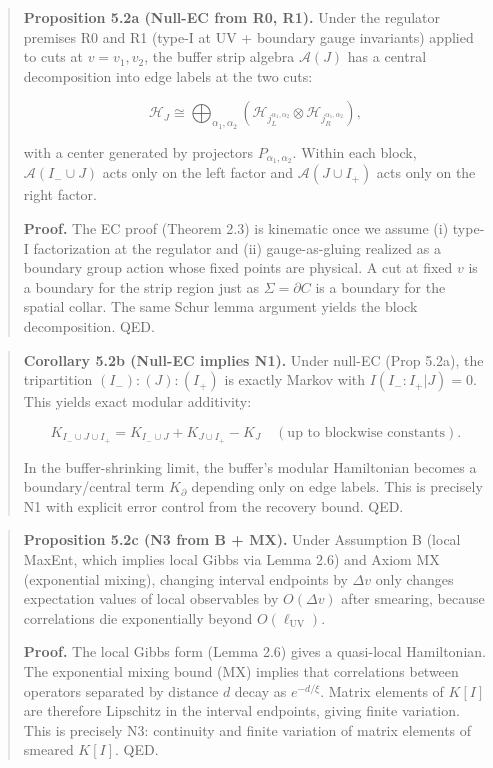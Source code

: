 \documentclass[11pt,a4paper]{article}
\theoremstyle{remark}
\begin{document}
\begin{quote}
\textbf{Proposition 5.2a (Null-EC from R0, R1).} Under the regulator premises R0
and R1 (type-I at UV + boundary gauge invariants) applied to cuts at
\(v = v_1, v_2\), the buffer strip algebra \(\mathcal{A}(J)\) has a central
decomposition into edge labels at the two cuts:

\[
\mathcal{H}_J \cong \bigoplus_{\alpha_1, \alpha_2}
\left(\mathcal{H}_{j_L^{\alpha_1, \alpha_2}} \otimes
\mathcal{H}_{j_R^{\alpha_1, \alpha_2}}\right),
\]

with a center generated by projectors \(P_{\alpha_1, \alpha_2}\). Within each
block, \(\mathcal{A}(I_- \cup J)\) acts only on the left factor and
\(\mathcal{A}(J \cup I_+)\) acts only on the right factor.

\textbf{Proof.} The EC proof (Theorem 2.3) is kinematic once we assume
(i) type-I factorization at the regulator and (ii) gauge-as-gluing realized
as a boundary group action whose fixed points are physical. A cut at fixed
\(v\) is a boundary for the strip region just as \(\Sigma = \partial C\) is a
boundary for the spatial collar. The same Schur lemma argument yields the
block decomposition. QED.
\end{quote}

\begin{quote}
\textbf{Corollary 5.2b (Null-EC implies N1).} Under null-EC (Prop 5.2a), the
tripartition \((I_-):(J):(I_+)\) is exactly Markov with \(I(I_-:I_+ | J) = 0\).
This yields exact modular additivity:

\[
K_{I_- \cup J \cup I_+} = K_{I_- \cup J} + K_{J \cup I_+} - K_J
\quad (\text{up to blockwise constants}).
\]

In the buffer-shrinking limit, the buffer's modular Hamiltonian becomes a
boundary/central term \(K_\partial\) depending only on edge labels. This is
precisely N1 with explicit error control from the recovery bound. QED.
\end{quote}

\begin{quote}
\textbf{Proposition 5.2c (N3 from B + MX).} Under Assumption B (local MaxEnt,
which implies local Gibbs via Lemma 2.6) and Axiom MX (exponential mixing),
changing interval endpoints by \(\Delta v\) only changes expectation values of
local observables by \(O(\Delta v)\) after smearing, because correlations die
exponentially beyond \(O(\ell_{\mathrm{UV}})\).

\textbf{Proof.} The local Gibbs form (Lemma 2.6) gives a quasi-local Hamiltonian.
The exponential mixing bound (MX) implies that correlations between operators
separated by distance \(d\) decay as \(e^{-d/\xi}\). Matrix elements of \(K[I]\)
are therefore Lipschitz in the interval endpoints, giving finite variation.
This is precisely N3: continuity and finite variation of matrix elements of
smeared \(K[I]\). QED.
\end{quote}
\end{document}
